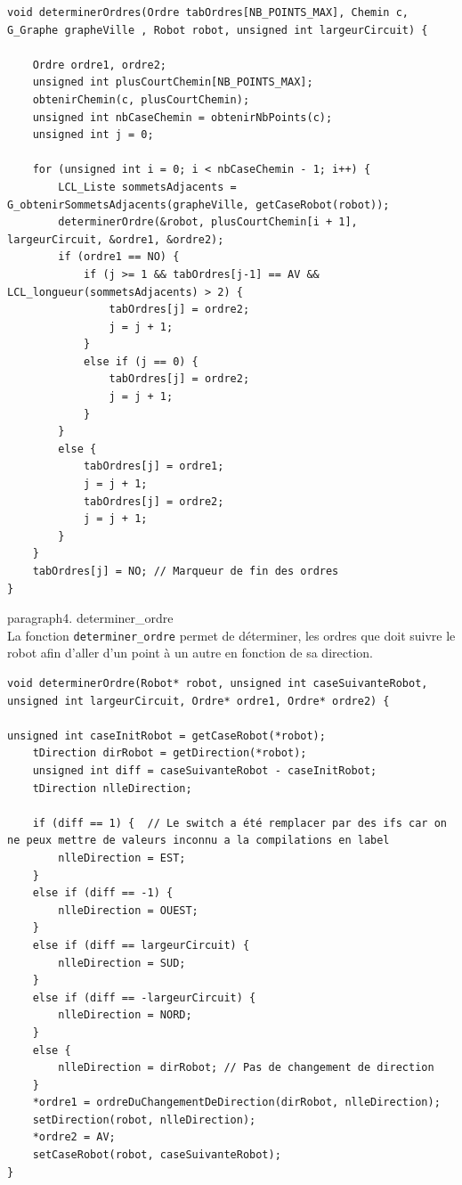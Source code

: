\documentclass[11pt,a4paper]{article}
\begin{document}
\begin{lstlisting}[caption={Fonction déterminer ordres}, label=lst:det_ordres]
void determinerOrdres(Ordre tabOrdres[NB_POINTS_MAX], Chemin c, G_Graphe grapheVille , Robot robot, unsigned int largeurCircuit) {
    
    Ordre ordre1, ordre2;
    unsigned int plusCourtChemin[NB_POINTS_MAX];
    obtenirChemin(c, plusCourtChemin);
    unsigned int nbCaseChemin = obtenirNbPoints(c);
    unsigned int j = 0;

    for (unsigned int i = 0; i < nbCaseChemin - 1; i++) {
        LCL_Liste sommetsAdjacents = G_obtenirSommetsAdjacents(grapheVille, getCaseRobot(robot));
        determinerOrdre(&robot, plusCourtChemin[i + 1], largeurCircuit, &ordre1, &ordre2);
        if (ordre1 == NO) {
            if (j >= 1 && tabOrdres[j-1] == AV && LCL_longueur(sommetsAdjacents) > 2) {
                tabOrdres[j] = ordre2;
                j = j + 1;
            }
            else if (j == 0) {
                tabOrdres[j] = ordre2;
                j = j + 1;
            }
        }
        else {
            tabOrdres[j] = ordre1;
            j = j + 1;
            tabOrdres[j] = ordre2;
            j = j + 1;
        }
    }
    tabOrdres[j] = NO; // Marqueur de fin des ordres
}
\end{lstlisting}

paragraph{4. determiner\_ordre} \mbox{} \\[5pt]

La fonction \texttt{determiner\_ordre} permet de déterminer, les ordres que doit suivre le robot afin d'aller d'un point à un autre en fonction de sa direction.

\begin{lstlisting}[caption={Fonction déterminer ordre}, label=lst:det_ordre]
void determinerOrdre(Robot* robot, unsigned int caseSuivanteRobot, unsigned int largeurCircuit, Ordre* ordre1, Ordre* ordre2) {
    
unsigned int caseInitRobot = getCaseRobot(*robot);
    tDirection dirRobot = getDirection(*robot);
    unsigned int diff = caseSuivanteRobot - caseInitRobot;
    tDirection nlleDirection;

    if (diff == 1) {  // Le switch a été remplacer par des ifs car on ne peux mettre de valeurs inconnu a la compilations en label 
        nlleDirection = EST;
    }
    else if (diff == -1) {
        nlleDirection = OUEST;
    }
    else if (diff == largeurCircuit) {
        nlleDirection = SUD;
    }
    else if (diff == -largeurCircuit) {
        nlleDirection = NORD;
    }
    else {
        nlleDirection = dirRobot; // Pas de changement de direction
    }
    *ordre1 = ordreDuChangementDeDirection(dirRobot, nlleDirection);
    setDirection(robot, nlleDirection);
    *ordre2 = AV;
    setCaseRobot(robot, caseSuivanteRobot);    
}
\end{lstlisting}
\end{document}
